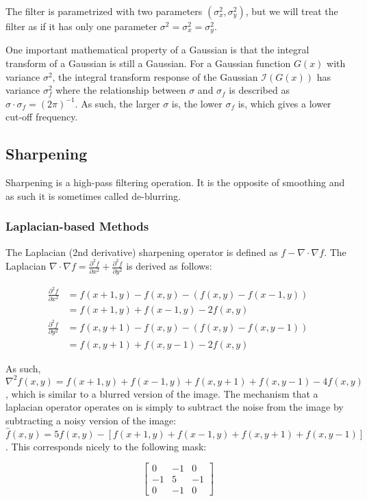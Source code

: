 \documentclass{article}
\begin{document}
\begin{multicols}{2}
The filter is parametrized with two parameters $(\sigma^2_x,\sigma^2_y)$, but we will treat the filter as if it has only one parameter $\sigma^2 = \sigma^2_x = \sigma^2_y$.

One important mathematical property of a Gaussian is that the integral transform of a Gaussian is still a Gaussian. For a Gaussian function $G(x)$ with variance $\sigma^2$, the integral transform response of the Gaussian $\mathcal{I}(G(x))$ has variance $\sigma_f^2$ where the relationship between $\sigma$ and $\sigma_f$ is described as $\sigma \cdot \sigma_f = (2\pi)^{-1}$. As such, the larger $\sigma$ is, the lower $\sigma_f$ is, which gives a lower cut-off frequency.

\subsection{Sharpening}

Sharpening is a high-pass filtering operation. It is the opposite of smoothing and as such it is sometimes called de-blurring.

\subsubsection{Laplacian-based Methods}

The Laplacian (2nd derivative) sharpening operator is defined as $f - \nabla \cdot \nabla f$. The Laplacian $\nabla \cdot \nabla f = \frac{\partial^2f}{\partial x^2} + \frac{\partial^2f}{\partial y^2}$ is derived as follows:

\[
\begin{aligned}
  \frac{\partial^2f}{\partial x^2} &= f(x+1,y) - f(x,y) - (f(x,y) - f(x-1,y))\\
  & = f(x+1,y) + f(x-1,y) - 2f(x,y) \\ 
  \frac{\partial^2f}{\partial y^2} &= f(x,y+1) - f(x,y) - (f(x,y) - f(x,y-1))\\
  & = f(x,y+1) + f(x,y-1) - 2f(x,y)
\end{aligned}
\]

As such, $\nabla^2 f(x,y) = f(x+1,y) + f(x-1,y) + f(x,y+1) + f(x,y-1) - 4f(x,y)$, which is similar to a blurred version of the image. The mechanism that a laplacian operator operates on is simply to subtract the noise from the image by subtracting a noisy version of the image: $\hat f(x,y) = 5f(x,y) - [f(x+1,y)+f(x-1,y)+f(x,y+1)+f(x,y-1)]$. This corresponds nicely to the following mask:

$$
\begin{bmatrix}
  0 & -1 & 0\\
  -1 & 5 & -1\\
  0 & -1 & 0
\end{bmatrix}
$$


\end{multicols}
\end{document}
